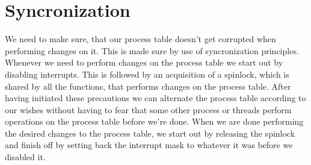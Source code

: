 \documentclass[11pt,a4paper]{article}
\begin{document}
\section{Syncronization}
We need to make sure, that our process table doesn't get corrupted when
performing changes on it. This is made sure by use of syncronization
principles. Whenever we need to perform changes on the process table we start
out by disabling interrupts. This is followed by an acquisition of a spinlock,
which is shared by all the functions, that performs changes on the process
table. After having initiated these precautions we can alternate the process
table according to our wishes without having to fear that some other process or
threads perform operations on the process table before we're done. When we are
done performing the desired changes to the process table, we start out by
releasing the spinlock and finish off by setting back the interrupt mask to
whatever it was before we disabled it.
\end{document}
